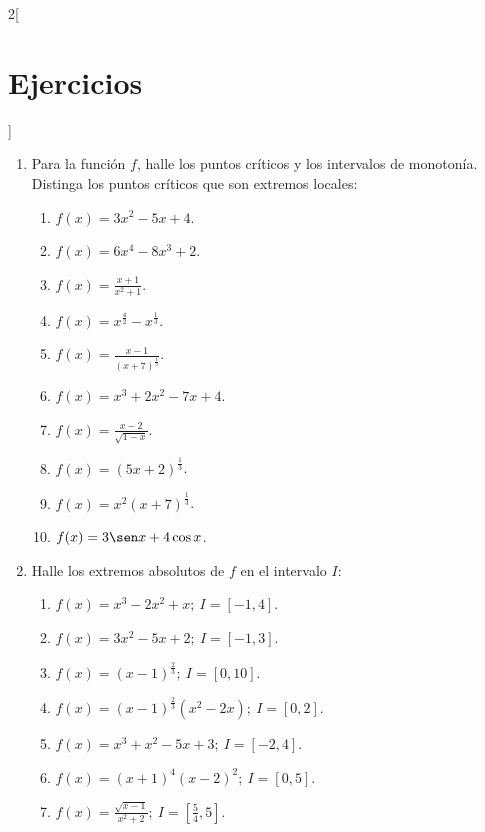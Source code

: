 \begin{multicols}{2}[\section{Ejercicios}]
\begingroup
\small
\begin{enumerate}[leftmargin=*]
\item Para la función $f$, halle los puntos críticos y los intervalos de monotonía. Distinga
    los puntos críticos que son extremos locales:
    \begin{enumerate}[leftmargin=*]
    \item $\displaystyle f(x) = 3x^2 - 5x + 4$.
    \item $\displaystyle f(x) = 6x^4 - 8x^3 + 2$.
    \item $\displaystyle f(x) = \frac{x + 1}{x^2 + 1}$.
    \item $\displaystyle f(x) = x^{\frac{4}{2}} - x^{\frac{1}{3}}$.
    \item $\displaystyle f(x) = \frac{x - 1}{(x + 7)^{\frac{1}{3}}}$.
    \item $\displaystyle f(x) = x^3 + 2x^2 - 7x + 4$.
    \item $\displaystyle f(x) = \frac{x - 2}{\sqrt{1 - x}}$.
    \item $\displaystyle f(x) = (5x + 2)^{\frac{1}{3}}$.
    \item $\displaystyle f(x) = x^2(x + 7)^{\frac{1}{3}}$.
    \item $\displaystyle f(x) = 3\sen x + 4\cos x$.
    \end{enumerate}

\item Halle los extremos absolutos de $f$ en el intervalo $I$:
    \begin{enumerate}[leftmargin=*]
    \item $\displaystyle f(x) = x^3 - 2x^2 + x; \ I = [-1,4]$.
    \item $\displaystyle f(x) = 3x^2 - 5x + 2; \ I = [-1,3]$.
    \item $\displaystyle f(x) = (x - 1)^{\frac{2}{3}}; \ I = [0,10]$.
    \item $\displaystyle f(x) = (x - 1)^{\frac{2}{3}}(x^2 - 2x); \ I = [0,2]$.
    \item $\displaystyle f(x) = x^3 + x^2 - 5x + 3; \ I = [-2,4]$.
    \item $\displaystyle f(x) = (x + 1)^4(x - 2)^2; \ I = [0,5]$.
    \item $\displaystyle f(x) = \frac{\sqrt{x - 1}}{x^2 + 2}; \ I =
        \left[\frac{5}{4},5\right]$.
    \end{enumerate}


\end{enumerate}
\end{multicols}
